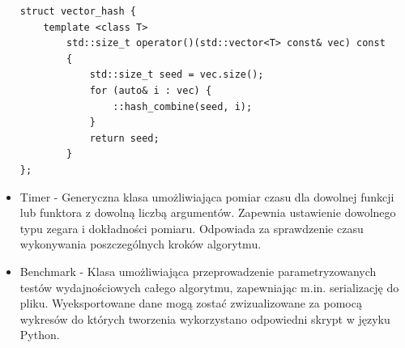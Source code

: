 \documentclass[12pt]{article}
\newcounter{operator}
\newcounter{algorytm}
\begin{document}
\begin{itemize}
\begin{minipage}{\linewidth}
\begin{lstlisting}[caption={Kod struktury vector\_hash}]
struct vector_hash {
	template <class T>
		std::size_t operator()(std::vector<T> const& vec) const 
        {
            std::size_t seed = vec.size();
            for (auto& i : vec) {
                ::hash_combine(seed, i);
            }
			return seed;
		}
};
\end{lstlisting}
\end{minipage}


\item Timer - Generyczna klasa umożliwiająca pomiar czasu dla dowolnej funkcji lub funktora z dowolną liczbą argumentów. Zapewnia ustawienie dowolnego typu zegara i dokładności pomiaru. Odpowiada za sprawdzenie czasu wykonywania poszczególnych kroków algorytmu.

\item Benchmark - Klasa umożliwiająca przeprowadzenie parametryzowanych testów wydajnościowych całego algorytmu, zapewniając m.in. serializację do pliku. Wyeksportowane dane mogą zostać zwizualizowane za pomocą wykresów do których tworzenia wykorzystano odpowiedni skrypt w języku Python.

\end{itemize}
\end{document}
